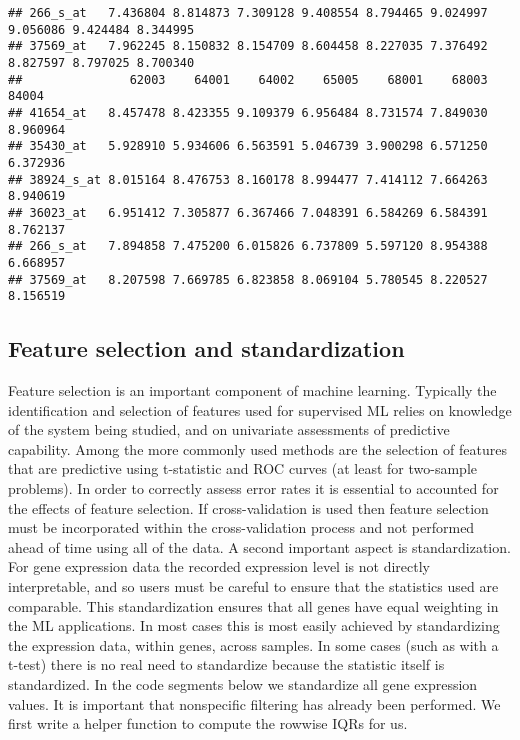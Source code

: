 \begin{verbatim}
## 266_s_at   7.436804 8.814873 7.309128 9.408554 8.794465 9.024997 9.056086 9.424484 8.344995
## 37569_at   7.962245 8.150832 8.154709 8.604458 8.227035 7.376492 8.827597 8.797025 8.700340
##               62003    64001    64002    65005    68001    68003    84004
## 41654_at   8.457478 8.423355 9.109379 6.956484 8.731574 7.849030 8.960964
## 35430_at   5.928910 5.934606 6.563591 5.046739 3.900298 6.571250 6.372936
## 38924_s_at 8.015164 8.476753 8.160178 8.994477 7.414112 7.664263 8.940619
## 36023_at   6.951412 7.305877 6.367466 7.048391 6.584269 6.584391 8.762137
## 266_s_at   7.894858 7.475200 6.015826 6.737809 5.597120 8.954388 6.668957
## 37569_at   8.207598 7.669785 6.823858 8.069104 5.780545 8.220527 8.156519
\end{verbatim}

\hypertarget{feature-selection-and-standardization}{%
\subsection{Feature selection and
standardization}\label{feature-selection-and-standardization}}

Feature selection is an important component of machine learning.
Typically the identification and selection of features used for
supervised ML relies on knowledge of the system being studied, and on
univariate assessments of predictive capability. Among the more commonly
used methods are the selection of features that are predictive using
t-statistic and ROC curves (at least for two-sample problems). In order
to correctly assess error rates it is essential to accounted for the
effects of feature selection. If cross-validation is used then feature
selection must be incorporated within the cross-validation process and
not performed ahead of time using all of the data. A second important
aspect is standardization. For gene expression data the recorded
expression level is not directly interpretable, and so users must be
careful to ensure that the statistics used are comparable. This
standardization ensures that all genes have equal weighting in the ML
applications. In most cases this is most easily achieved by
standardizing the expression data, within genes, across samples. In some
cases (such as with a t-test) there is no real need to standardize
because the statistic itself is standardized. In the code segments below
we standardize all gene expression values. It is important that
nonspecific filtering has already been performed. We first write a
helper function to compute the rowwise IQRs for us.

